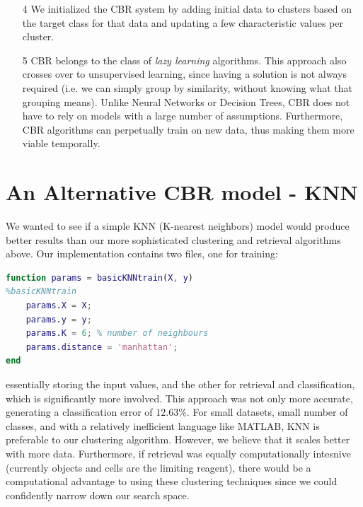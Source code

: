 \documentclass[a4paper,12pt,oneside,final]{report}
\newenvironment{changemargin}[2]{\begin{list}{}{%
\setlength{\topsep}{0pt}%
\setlength{\leftmargin}{0pt}%
\setlength{\rightmargin}{0pt}%
\setlength{\listparindent}{\parindent}%
\setlength{\itemindent}{\parindent}%
\setlength{\parsep}{0pt plus 1pt}%
\addtolength{\leftmargin}{#1}%
\addtolength{\rightmargin}{#2}%
}\item }{\end{list}}
\begin{document}
\begin{itemize}
\begin{itemize}
\end{itemize}
\item[4]  We initialized the CBR system by adding initial data to clusters based on the target class for that data and updating a few characteristic values per cluster.  
\item[5] CBR belongs to the class of \emph{lazy learning} algorithms.  This approach also crosses over to unsupervised learning, since having a solution is not always required (i.e. we can simply group by similarity, without knowing what that grouping means).  Unlike Neural Networks or Decision Trees, CBR does not have to rely on models with a large number of assumptions.  Furthermore, CBR algorithms can perpetually train on new data, thus making them more viable temporally.
\end{itemize}

\chapter{An Alternative CBR model - KNN}
We wanted to see if a simple KNN (K-nearest neighbors) model would produce better results than our more sophisticated clustering and retrieval algorithms above.  Our implementation contains two files, one for training:
\begin{changemargin}{-5mm}{-5mm}
\begin{lstlisting}[language=Matlab, frame=single]
function params = basicKNNtrain(X, y)
%basicKNNtrain
    params.X = X;
    params.y = y;
    params.K = 6; % number of neighbours
    params.distance = 'manhattan';
end
\end{lstlisting}
\end{changemargin}
essentially storing the input values, and the other for retrieval and classification, which is significantly more involved.  This approach was not only more accurate, generating a classification error of $12.63\%$.  For small datasets, small number of classes, and with a relatively inefficient language like MATLAB, KNN is preferable to our clustering algorithm.  However, we believe that it scales better with more data.  Furthermore, if retrieval was equally computationally intesnive (currently objects and cells are the limiting reagent), there would be a computational advantage to using these clustering techniques since we could confidently narrow down our search space.


\section{}
\end{document}

